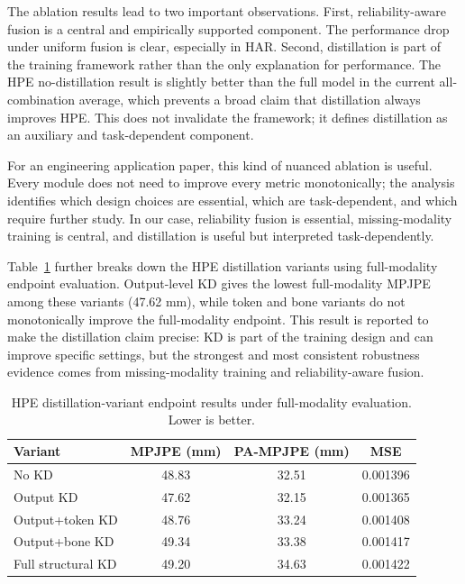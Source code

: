 \documentclass[preprint,12pt]{elsarticle}
\newcommand{\mpjpe}{MPJPE}
\newcommand{\pampjpe}{PA-MPJPE}
\begin{document}
The ablation results lead to two important observations. First, reliability-aware fusion is a central and empirically supported component. The performance drop under uniform fusion is clear, especially in HAR. Second, distillation is part of the training framework rather than the only explanation for performance. The HPE no-distillation result is slightly better than the full model in the current all-combination average, which prevents a broad claim that distillation always improves HPE. This does not invalidate the framework; it defines distillation as an auxiliary and task-dependent component.

For an engineering application paper, this kind of nuanced ablation is useful. Every module does not need to improve every metric monotonically; the analysis identifies which design choices are essential, which are task-dependent, and which require further study. In our case, reliability fusion is essential, missing-modality training is central, and distillation is useful but interpreted task-dependently.

Table~\ref{tab:hpe_kd_variants} further breaks down the HPE distillation variants using full-modality endpoint evaluation. Output-level KD gives the lowest full-modality \mpjpe{} among these variants (47.62 mm), while token and bone variants do not monotonically improve the full-modality endpoint. This result is reported to make the distillation claim precise: KD is part of the training design and can improve specific settings, but the strongest and most consistent robustness evidence comes from missing-modality training and reliability-aware fusion.

\begin{table}[t]
\centering
\caption{HPE distillation-variant endpoint results under full-modality evaluation. Lower is better.}
\label{tab:hpe_kd_variants}
\begin{tabular}{lccc}
\toprule
Variant & \mpjpe{} (mm) & \pampjpe{} (mm) & MSE \\
\midrule
No KD & 48.83 & 32.51 & 0.001396 \\
Output KD & 47.62 & 32.15 & 0.001365 \\
Output+token KD & 48.76 & 33.24 & 0.001408 \\
Output+bone KD & 49.34 & 33.38 & 0.001417 \\
Full structural KD & 49.20 & 34.63 & 0.001422 \\
\bottomrule
\end{tabular}
\end{table}
\end{document}
